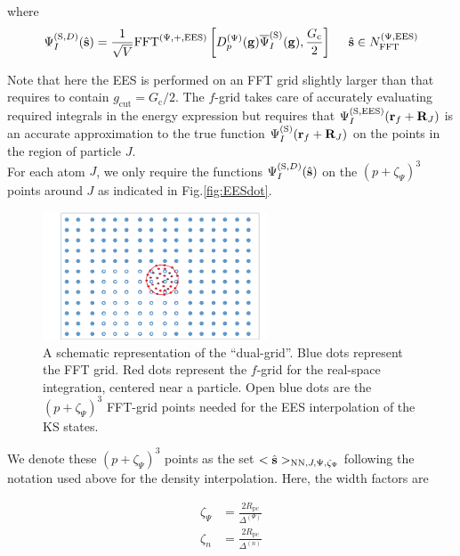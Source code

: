 \documentclass[paper=a4, fontsize=11pt]{article} %
\numberwithin{equation}{section} %
\numberwithin{figure}{section} %
\numberwithin{table}{section} %
\newcommand{\bs}{{\bf{s}}}
\newcommand{\bg}{{\bf{g}}}
\newcommand{\br}{{\bf{r}}}
\newcommand{\bR}{{\bf{R}}}
\newcommand{\hs}{{\hat{\bf{s}}}}
\newcommand{\rS}{{\mathrm{S}}}
\newcommand{\rEES}{{\mathrm{EES}}}
\newcommand{\rcut}{{\mathrm{cut}}}
\newcommand{\rNN}{{\mathrm{NN}}}
\newcommand{\psigs}{{\overline \Psi_I^{(\rS)}(\bg)}}
\newcommand{\NFFTpEES}{{N^{\mathrm{(\Psi,\rEES})}_{\mathrm{FFT}}}}
\newcommand{\Gc}{{G_{\mathrm{c}}}}
\newcommand{\hGc}{{\frac{G_{\mathrm{c}}}{2}}}
\newcommand{\Rpc}{{R_{\mathrm{pc}}}}
\newcommand{\Dpg}{{D^{(\Psi)}_p(\bg)}}
\newcommand{\FFTpEES}{{\mathrm{FFT}^{(\Psi,+,\rEES)}}}
\newcommand{\pzp}{{(p+\zeta_{\Psi})^3}}
\newcommand{\hsJp}{{<\hs>_{\rNN,J,\Psi,\zeta_\Psi}}}
\newcommand{\hsinpEES}{{\ \ \ \ \hs \in \NFFTpEES}}
\begin{document}
where 
\begin{equation}
\begin{split}
\Psi_I^{(\rS,D)}(\hat \bs) &= \frac{1}{\sqrt V} \FFTpEES \left[  \Dpg \psigs,\hGc \right] \hsinpEES \\
\end{split}
\end{equation}

Note that here the EES is performed on an FFT grid slightly larger than that requires to contain $g_\rcut =\Gc/2$. The $f$-grid takes care of accurately evaluating required integrals in the energy expression but requires that $\Psi_I^{(\rS,\rEES)}(\br_f+\bR_J)$ is an accurate approximation to the true function $\Psi_I^{(\rS)}(\br_f+\bR_J)$ on the points in the region of particle $J$.\\

For each atom $J$, we only require the functions $\Psi_I^{(\rS,D)}(\hat \bs)$ on the $\pzp$ points around $J$ as indicated in Fig.\eqref{fig:EESdot}.


\begin{figure}[!htbp] 
    \centering
    \includegraphics[width=0.6\textwidth]{EESdot}
    \caption{A schematic representation of the ``dual-grid''. Blue dots represent the FFT grid. Red dots represent the $f$-grid for the real-space integration, centered near a particle. Open blue dots are the $\pzp$ FFT-grid points needed for the EES interpolation of the KS states.} 
    \label{fig:EESdot}
\end{figure}


We denote these $\pzp$ points as the set  $\hsJp$ following the notation used above for the density interpolation. Here, the width factors are 

\begin{equation}
\begin{split}
\zeta_{\Psi} &= \frac{2\Rpc}{\Delta^{(\Psi)}}\\
\zeta_{n} &= \frac{2\Rpc}{\Delta^{(n)}}\\
\end{split}
\end{equation}
\end{document}
